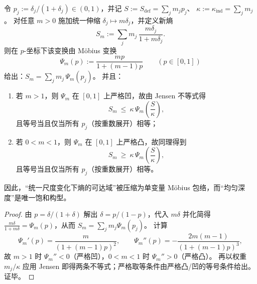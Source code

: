 

\begin{proposition}\label{prop:xi-defect-entropy-uniform-scaling-jensen-envelope}
令
\(
p_j:=\delta_j/(1+\delta_j)\in(0,1)
\)，并记
\(
S:=S_{\mathrm{def}}=\sum_j m_j p_j
\)、
\(
\kappa:=\kappa_{\mathrm{ind}}=\sum_j m_j
\)。
对任意 \(m>0\) 施加统一伸缩 \(\delta_j\mapsto m\delta_j\)，并定义新熵
\[
S_m:=\sum_j m_j\,\frac{m\delta_j}{1+m\delta_j}.
\]
则在 \(p\)-坐标下该变换由 Möbius 变换
\begin{equation}\label{eq:xi-defect-entropy-scaling-mobius}
\boxed{\;
\Psi_m(p):=\frac{mp}{1+(m-1)p}\qquad(p\in[0,1])\;}
\end{equation}
给出：\(S_m=\sum_j m_j\,\Psi_m(p_j)\)。
并且：
\begin{enumerate}
  \item 若 \(m>1\)，则 \(\Psi_m\) 在 \([0,1]\) 上严格凹，故由 Jensen 不等式得
  \[
  \boxed{\;
  S_m\ \le\ \kappa\,\Psi_m\!\left(\frac{S}{\kappa}\right),\;}
  \]
  且等号当且仅当所有 \(p_j\)（按重数展开）相等；
  \item 若 \(0<m<1\)，则 \(\Psi_m\) 在 \([0,1]\) 上严格凸，故同理得到
  \[
  \boxed{\;
  S_m\ \ge\ \kappa\,\Psi_m\!\left(\frac{S}{\kappa}\right),\;}
  \]
  且等号当且仅当所有 \(p_j\)（按重数展开）相等。
\end{enumerate}
因此，“统一尺度变化下熵的可达域”被压缩为单变量 Möbius 包络，而“均匀深度”是唯一饱和构型。
\end{proposition}

\begin{proof}
由 \(p=\delta/(1+\delta)\) 解出 \(\delta=p/(1-p)\)，代入 \(m\delta\) 并化简得
\(\frac{m\delta}{1+m\delta}=\Psi_m(p)\)，从而 \(S_m=\sum_j m_j\Psi_m(p_j)\)。
计算
\[
\Psi_m'(p)=\frac{m}{(1+(m-1)p)^2},
\qquad
\Psi_m''(p)=-\frac{2m(m-1)}{(1+(m-1)p)^3},
\]
故 \(m>1\) 时 \(\Psi_m''<0\)（严格凹），\(0<m<1\) 时 \(\Psi_m''>0\)（严格凸）。
再以权重 \(m_j/\kappa\) 应用 Jensen 即得两条不等式；严格取等条件由严格凸/凹的等号条件给出。证毕。
\end{proof}


